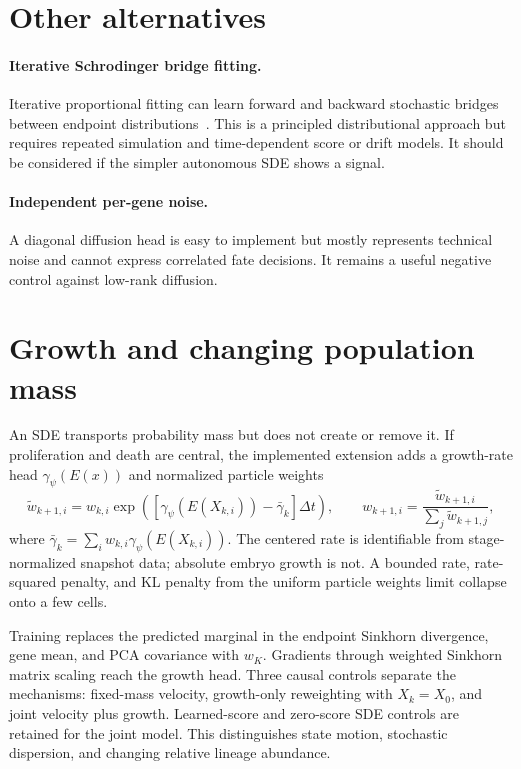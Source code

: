 \documentclass[11pt]{article}
\begin{document}
\section{Other alternatives}

\paragraph{Iterative Schrodinger bridge fitting.}
Iterative proportional fitting can learn forward and backward stochastic
bridges between endpoint distributions~\cite{debortoli2021diffusion}. This is a
principled distributional approach but requires repeated simulation and
time-dependent score or drift models. It should be considered if the simpler
autonomous SDE shows a signal.

\paragraph{Independent per-gene noise.}
A diagonal diffusion head is easy to implement but mostly represents technical
noise and cannot express correlated fate decisions. It remains a useful
negative control against low-rank diffusion.

\section{Growth and changing population mass}

An SDE transports probability mass but does not create or remove it. If
proliferation and death are central, the implemented extension adds a
growth-rate head $\gamma_\psi(E(x))$ and normalized particle weights
\begin{equation}
  \widetilde w_{k+1,i}=w_{k,i}\exp\!\left(
    [\gamma_\psi(E(X_{k,i}))-\bar\gamma_k]\Delta t\right),
  \qquad
  w_{k+1,i}=\frac{\widetilde w_{k+1,i}}
  {\sum_j\widetilde w_{k+1,j}},
  \label{eq:growth-weights}
\end{equation}
where $\bar\gamma_k=\sum_iw_{k,i}\gamma_\psi(E(X_{k,i}))$. The centered rate
is identifiable from stage-normalized snapshot data; absolute embryo growth
is not. A bounded rate, rate-squared penalty, and KL penalty from the uniform
particle weights limit collapse onto a few cells.

Training replaces the predicted marginal in the endpoint Sinkhorn divergence,
gene mean, and PCA covariance with $w_K$. Gradients through weighted Sinkhorn
matrix scaling reach the growth head. Three causal controls separate the
mechanisms: fixed-mass velocity, growth-only reweighting with $X_k=X_0$, and
joint velocity plus growth. Learned-score and zero-score SDE controls are
retained for the joint model. This distinguishes state motion, stochastic
dispersion, and changing relative lineage abundance.
\end{document}
